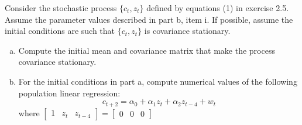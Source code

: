 \documentclass{homework}
\begin{document}
\maketitle

\begin{homeworkProblem}[Problem 2.6]

  Consider the stochastic process $\{c_t,z_t\}$ defined by equations (1) in exercise 2.5. Assume the parameter values described in part b, item i. If possible, assume the initial conditions are such that $\{c_t,z_t\}$ is covariance stationary.

  \begin{enumerate}[a.]
    \item Compute the initial mean and covariance matrix that make the process covariance stationary.
    \item For the initial conditions in part a, compute numerical values of the following population linear regression: $$ c_{t+2} =\alpha_0  + \alpha_1 z_t + \alpha_2 z_{t-4} + w_t$$ where $\left[\begin{smallmatrix} 1 & z_t & z_{t-4} \end{smallmatrix}\right] = \left[\begin{smallmatrix} 0 & 0 & 0 \end{smallmatrix}\right]$
  \end{enumerate}

  \vspace{.2in}

\end{homeworkProblem}
\end{document}

